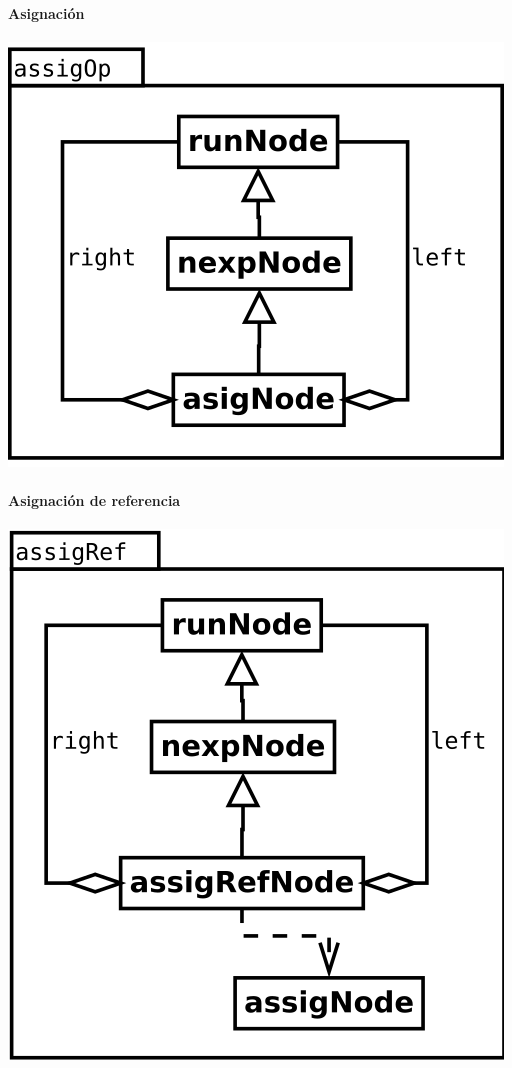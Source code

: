 \paragraph {Asignación}
\begin{center}
\includegraphics[scale=0.4]{assigNode.png} \\
\end{center}

\paragraph {Asignación de referencia}
\begin{center}
\includegraphics[scale=0.4]{assigRef.png} \\
\end{center}

